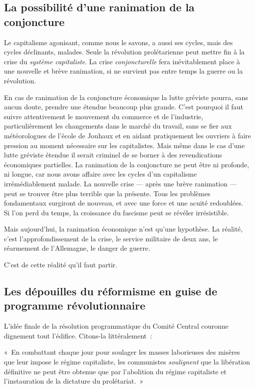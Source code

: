 \documentclass[french,twoside]{book} %
\newenvironment{quoteblock}%
  {\begin{quoting}}
  {\end{quoting}}
\newenvironment{quotebar}{%
    \def\FrameCommand{{\color{rubric!10!}\vrule width 0.5em} \hspace{0.9em}}%
    \def\OuterFrameSep{\itemsep} %
    \MakeFramed {\advance\hsize-\width \FrameRestore}
  }%
  {%
    \endMakeFramed
  }
\renewenvironment{quoteblock}%
  {%
    \savenotes
    \setstretch{0.9}
    \normalfont
    \begin{quotebar}
  }
  {%
    \end{quotebar}
    \spewnotes
  }
\begin{document}
 \subsection[{La possibilité d’une ranimation de la conjoncture}]{La possibilité d’une ranimation de la conjoncture}
\noindent Le capitalisme agonisant, comme nous le savons, a aussi ses cycles, mais des cycles déclinants, malades. Seule la révolution prolétarienne peut mettre fin à la crise du \emph{système capitaliste}. La crise \emph{conjoncturelle} fera inévitablement place à une nouvelle et brève ranimation, si ne survient pas entre temps la guerre ou la révolution.\par
En cas de ranimation de la conjoncture économique la lutte gréviste pourra, sans aucun doute, prendre une étendue beaucoup plus grande. C’est pourquoi il faut suivre attentivement le mouvement du commerce et de l’industrie, particulièrement les changements dans le marché du travail, sans se fier aux météorologues de l’école de Jouhaux et en aidant pratiquement les ouvriers à faire pression au moment nécessaire sur les capitalistes. Mais même dans le cas d’une lutte gréviste étendue il serait criminel de se borner à des revendications économiques partielles. La ranimation de la conjoncture ne peut être ni profonde, ni longue, car nous avons affaire avec les cycles d’un capitalisme irrémédiablement malade. La nouvelle crise — après une brève ranimation — peut se trouver être plus terrible que la présente. Tous les problèmes fondamentaux surgiront de nouveau, et avec une force et une acuité redoublées. Si l’on perd du temps, la croissance du fascisme peut se révéler irrésistible.\par
Mais aujourd’hui, la ranimation économique n’est qu’une hypothèse. La réalité, c’est l’approfondissement de la crise, le service militaire de deux ans, le réarmement de l’Allemagne, le danger de guerre.\par
C’est de cette réalité qu’il faut partir.
\subsection[{Les dépouilles du réformisme en guise de programme révolutionnaire}]{Les dépouilles du réformisme en guise de programme révolutionnaire}
\noindent L’idée finale de la résolution programmatique du Comité  Central couronne dignement tout l’édifice. Citons-la littéralement :\par

\begin{quoteblock}
 \noindent « En combattant chaque jour pour soulager les masses laborieuses des misères que leur impose le régime capitaliste, les communistes \emph{soulignent} que la libération définitive ne peut être obtenue que par l’abolition du régime capitaliste et l’instauration de la dictature du prolétariat. »
 \end{quoteblock}
\end{document}
